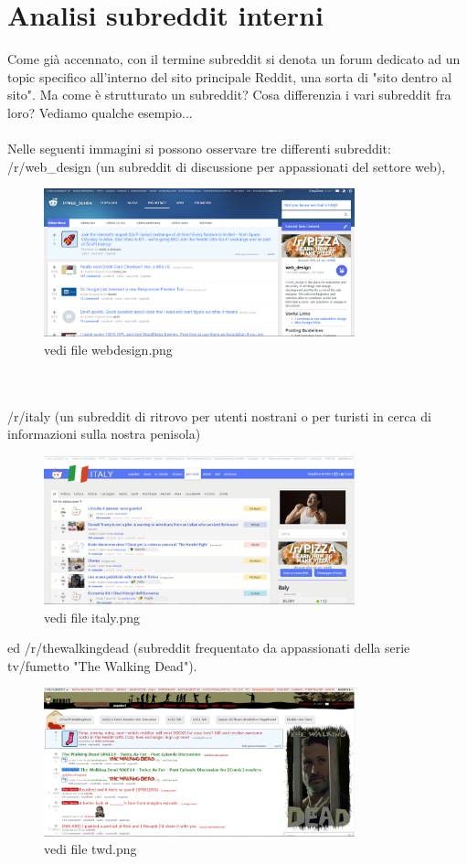 \documentclass[12pt]{article}
\begin{document}
\section{Analisi subreddit interni}
Come gi\`a accennato, con il termine subreddit si denota un forum dedicato ad un topic specifico all'interno del sito principale Reddit, una sorta di "sito dentro al sito". Ma come \`e strutturato un subreddit? Cosa differenzia i vari subreddit fra loro? Vediamo qualche esempio... \\ \\Nelle seguenti immagini si possono osservare tre differenti subreddit: /r/web\_design (un subreddit di discussione per appassionati del settore web),
\\
\begin{figure}[ht!]
\centering
\includegraphics[width=90mm]{webdesign}
\caption{vedi file webdesign.png}
\end{figure} 
\\ \\
 /r/italy (un subreddit di ritrovo per utenti nostrani o per turisti in cerca di informazioni sulla nostra penisola)
\\
\begin{figure}[ht!]
\centering
\includegraphics[width=90mm]{italy}
\caption{vedi file italy.png}
\end{figure} 
\newpage
ed /r/thewalkingdead (subreddit frequentato da appassionati della serie tv/fumetto "The Walking Dead").
\\
\begin{figure}[ht!]
\centering
\includegraphics[width=90mm]{twd}
\caption{vedi file twd.png}
\end{figure} 
\end{document}
